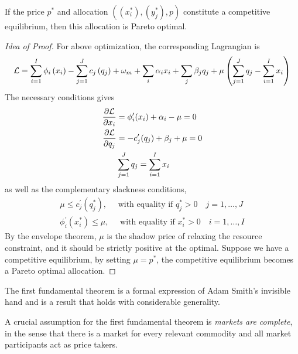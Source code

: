 \documentclass{report}
\begin{document}
		\begin{proposition}
			If the price $p^*$ and allocation $((x^*_i), (y^*_j), p)$ constitute a competitive equilibrium, then this allocation is Pareto optimal.
		\end{proposition}
		
		\begin{proof}[Idea of Proof]
			For above optimization, the corresponding Lagrangian is 
			\begin{equation}
				\mathcal{{L}} = \sum_{i=1}^{I} \phi_{i}\left(x_{i}\right)-\sum_{j=1}^{J} c_{j}\left(q_{j}\right)+\omega_{m} + \sum_i \alpha_i x_i + \sum_j \beta_j q_j + \mu \left (\sum_{j=1}^J q_j - \sum_{i=1}^I x_i \right)
			\end{equation}
			The necessary conditions gives
			\begin{align}
				\frac{\partial{\mathcal{{L}}}}{\partial{x_i}} &= \phi_i'(x_i) + \alpha_i - \mu = 0 \\
				\frac{\partial{\mathcal{{L}}}}{\partial{q_j}} &= -c_j'(q_j) + \beta_j + \mu = 0 \\
				&\sum_{j=1}^J q_j = \sum_{i=1}^I x_i
			\end{align}
			as well as the complementary slackness conditions, 
			\begin{align}
				\mu \leq c_{j}^{\prime}\left(q_{j}^{*}\right), \quad \text { with equality if } q_{j}^{*}>0 \quad j=1, \ldots, J \\
				\phi_{i}^{\prime}\left(x_{i}^{*}\right) \leq \mu, \quad \text { with equality if } x_{i}^{*}>0 \quad i=1, \ldots, I
			\end{align}
			By the envelope theorem, $\mu$ is the shadow price of relaxing the resource constraint, and it should be strictly positive at the optimal. Suppose we have a competitive equilibrium, by setting $\mu = p^*$, the competitive equilibrium becomes a Pareto optimal allocation.
		\end{proof}
		
		\begin{remark}
			The first fundamental theorem is a formal expression of Adam Smith's invisible hand and is a result that holds with considerable generality.
		\end{remark}
		
		\begin{remark}
			A crucial assumption for the first fundamental theorem is \emph{markets are complete}, in the sense that there is a market for every relevant commodity and all market participants act as price takers.
		\end{remark}
		
\end{document}
